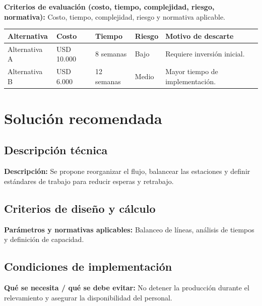 \documentclass[11pt,a4paper]{article}
\newcommand{\campo}[2]{\textbf{\textcolor{irdblack}{#1:}} \textcolor{irdblack}{#2}\par\vspace{0.3em}}
\begin{document}
\campo{Criterios de evaluación (costo, tiempo, complejidad, riesgo, normativa)}{Costo, tiempo, complejidad, riesgo y normativa aplicable.}

\vspace{0.5cm}

\begin{center}
\renewcommand{\arraystretch}{1.4}
\begin{tabular}{@{}p{3cm}p{2.2cm}p{2.2cm}p{2.2cm}>{\raggedright\arraybackslash}p{4.4cm}@{}}
\toprule
\textbf{\color{irdblack}Alternativa} & \textbf{\color{irdblack}Costo} & \textbf{\color{irdblack}Tiempo} & \textbf{\color{irdblack}Riesgo} & \textbf{\color{irdblack}Motivo de descarte} \\
\midrule
Alternativa A & USD 10.000 & 8 semanas & Bajo & Requiere inversión inicial. \\
\addlinespace
Alternativa B & USD 6.000 & 12 semanas & Medio & Mayor tiempo de implementación. \\
\bottomrule
\end{tabular}
\end{center}

\section{Solución recomendada}

\subsection{Descripción técnica}
\campo{Descripción}{Se propone reorganizar el flujo, balancear las estaciones y definir estándares de trabajo para reducir esperas y retrabajo.}

\subsection{Criterios de diseño y cálculo}
\campo{Parámetros y normativas aplicables}{Balanceo de líneas, análisis de tiempos y definición de capacidad.}

\subsection{Condiciones de implementación}
\campo{Qué se necesita / qué se debe evitar}{No detener la producción durante el relevamiento y asegurar la disponibilidad del personal.}
\end{document}
